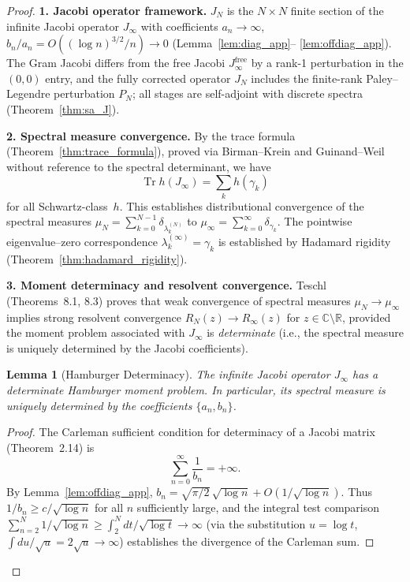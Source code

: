 \documentclass{pre-aomart}
\theoremstyle{plain}
\newtheorem{lemma}[theorem]{Lemma}
\theoremstyle{definition}
\theoremstyle{remark}
\begin{document}
\begin{proof}
\textbf{1. Jacobi operator framework.}
$J_N$ is the $N \times N$ finite section of the infinite Jacobi operator
$J_\infty$ with coefficients $a_n \to \infty$,
$b_n/a_n = O((\log n)^{3/2}/n) \to 0$ (Lemma~\ref{lem:diag_app}--%
\ref{lem:offdiag_app}).  The Gram Jacobi differs from the free Jacobi
$J_\infty^{\mathrm{free}}$ by a rank-1 perturbation in the $(0,0)$ entry, and the fully corrected operator $J_N$ includes the finite-rank Paley--Legendre perturbation $P_N$; all stages are self-adjoint with discrete spectra (Theorem~\ref{thm:sa_J}).

\textbf{2. Spectral measure convergence.}
By the trace formula (Theorem~\ref{thm:trace_formula}), proved
via Birman--Krein and Guinand--Weil without reference to the
spectral determinant, we have
\[
\operatorname{Tr} h(J_\infty) = \sum_k h(\gamma_k)
\]
for all Schwartz-class~$h$.  This establishes distributional convergence
of the spectral measures $\mu_N = \sum_{k=0}^{N-1}\delta_{\lambda_k^{(N)}}$
to $\mu_\infty = \sum_{k=0}^\infty \delta_{\gamma_k}$.
The pointwise eigenvalue--zero correspondence
$\lambda_k^{(\infty)} = \gamma_k$ is established by
Hadamard rigidity (Theorem~\ref{thm:hadamard_rigidity}).

\textbf{3. Moment determinacy and resolvent convergence.}
Teschl~\cite{Teschl2000} (Theorems~8.1, 8.3) proves that weak convergence
of spectral measures $\mu_N \to \mu_\infty$ implies strong resolvent
convergence $R_N(z) \to R_\infty(z)$ for
$z \in \mathbb{C}\setminus\mathbb{R}$, provided the moment problem
associated with $J_\infty$ is \emph{determinate} (i.e., the spectral
measure is uniquely determined by the Jacobi coefficients).

\begin{lemma}[Hamburger Determinacy]\label{lem:hamburger}
The infinite Jacobi operator $J_\infty$ has a determinate Hamburger
moment problem.  In particular, its spectral measure is uniquely
determined by the coefficients $\{a_n, b_n\}$.
\end{lemma}

\begin{proof}
The Carleman sufficient condition for determinacy of a Jacobi
matrix~\cite{Teschl2000} (Theorem~2.14) is
\[
\sum_{n=0}^{\infty} \frac{1}{b_n} = +\infty.
\]
By Lemma~\ref{lem:offdiag_app},
$b_n = \sqrt{\pi/2}\,\sqrt{\log n} + O(1/\sqrt{\log n})$.
Thus $1/b_n \ge c/\sqrt{\log n}$ for all $n$ sufficiently large,
and the integral test comparison $\sum_{n=2}^N 1/\sqrt{\log n}
\ge \int_2^N dt/\sqrt{\log t} \to \infty$ (via the substitution
$u = \log t$, $\int du/\sqrt{u} = 2\sqrt{u} \to \infty$) establishes
the divergence of the Carleman sum.


\end{proof}
\end{proof}
\end{document}
